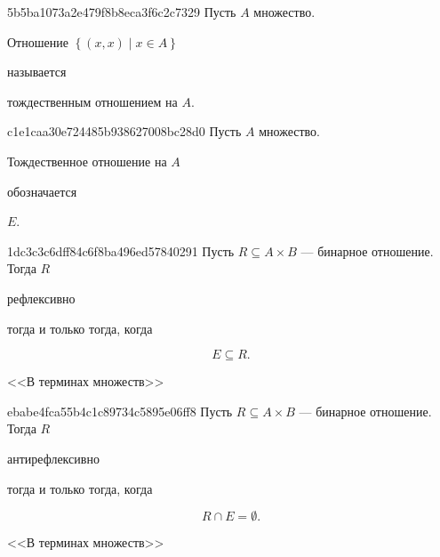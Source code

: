 \begin{note}{5b5ba1073a2e479f8b8eca3f6c2c7329}
    Пусть \({ A }\) множество. \begin{icloze}{1}Отношение \({ \left\{ (x, x) \mid x \in A \right\} }\)\end{icloze} называется \begin{icloze}{2}тождественным отношением на \({ A }\).\end{icloze}
\end{note}

\begin{note}{c1e1caa30e724485b938627008bc28d0}
    Пусть \({ A }\) множество. \begin{icloze}{2}Тождественное отношение на \({ A }\)\end{icloze} обозначается \begin{icloze}{1}\({ E }\).\end{icloze}
\end{note}

\begin{note}{1dc3c3c6dff84c6f8ba496ed57840291}
    Пусть \({ R \subseteq A \times B }\) --- бинарное отношение.
    Тогда \({ R }\) \begin{icloze}{2}рефлексивно\end{icloze} тогда и только тогда, когда
    \begin{icloze}{1}
        \[
            E \subseteq R.
        \]
    \end{icloze}

    \begin{center}
        \tiny
        <<В терминах множеств>>
    \end{center}
\end{note}

\begin{note}{ebabe4fca55b4c1c89734c5895e06ff8}
    Пусть \({ R \subseteq A \times B }\) --- бинарное отношение.
    Тогда \({ R }\) \begin{icloze}{2}антирефлексивно\end{icloze} тогда и только тогда, когда
    \begin{icloze}{1}
        \[
            R \cap E = \emptyset.
        \]
    \end{icloze}

    \begin{center}
        \tiny
        <<В терминах множеств>>
    \end{center}
\end{note}

